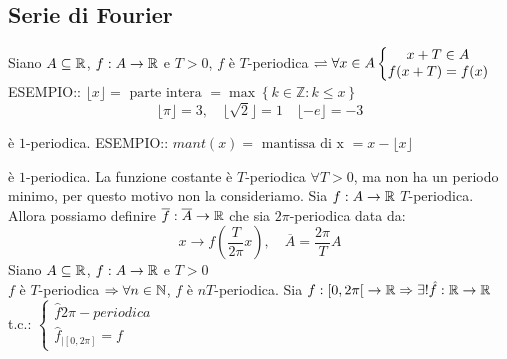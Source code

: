 \subsection{Serie di Fourier}
Siano $A\subseteq \mathbb{R}$, $f:A\to \mathbb{R}$ e $T>0$, $f$ è $T$-periodica $\rightleftharpoons \forall x\in A
\left\{\begin{matrix}
x+T\in A\\f(x+T)=f(x)
\end{matrix}\right. $\\


ESEMPIO:: $\lfloor x \rfloor = \text{ parte intera } = \max\left\{k\in\mathbb{Z}:k\le x\right\}$
$$\lfloor \pi \rfloor=3, \quad \lfloor \sqrt{2} \rfloor = 1 \quad \lfloor -e \rfloor = -3 $$
\begin{center}
\end{center}
è $1$-periodica.
ESEMPIO:: $mant(x)=\text{ mantissa di x } = x- \lfloor x \rfloor$
\begin{center}
\end{center}
è $1$-periodica.
\observation
La funzione costante è $T$-periodica $\forall T>0$, ma non ha un periodo minimo, per questo motivo non la consideriamo.
\observation
Sia $f:A\to \mathbb{R}$ $T$-periodica. Allora possiamo definire $\overline{f}:\overline{A}\to \mathbb{R}$ che sia $2\pi$-periodica data da:
$$x\to f\left(\frac{T}{2\pi}x\right),\quad \overline{A}=\frac{2\pi}{T}A$$
\proposition
Siano $A\subseteq \mathbb{R}$, $f:A\to \mathbb{R}$ e $T>0$\\
$f$ è $T$-periodica $\Rightarrow \forall n\in\mathbb{N}$, $f$ è $nT$-periodica.
\proposition
Sia $f:\left[0,2\pi\right[\to \mathbb{R} \Rightarrow \exists ! \hat{f}: \mathbb{R}\to \mathbb{R}$ t.c.: $\left\{\begin{matrix} \hat{f} 2\pi-periodica\\\hat{f}_{\left|\left[0,2\pi\right]\right.}=f\end{matrix}\right.$
